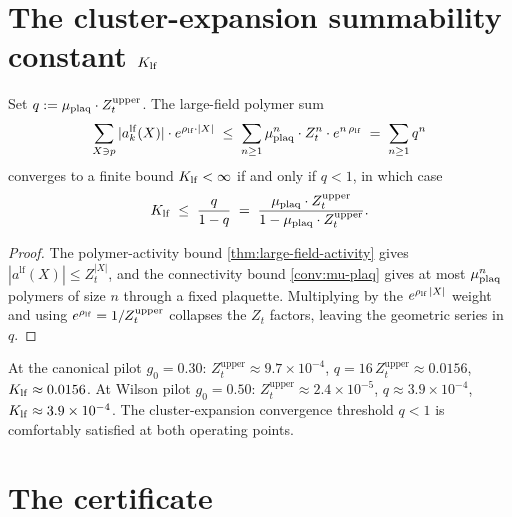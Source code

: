 \section{The cluster-expansion summability constant
  \texorpdfstring{$K_{\mathrm{lf}}$}{K\_lf}}
\label{sec:klf}

%

\begin{theorem}
\label{thm:klf-convergence}
Set $q := \mu_{\mathrm{plaq}} \cdot Z_t^{\mathrm{upper}}$.  The large-field
polymer sum
\begin{equation}
  \label{eq:polymer-sum-lf}
  \sum_{X \ni p} |a_k^{\mathrm{lf}}(X)| \cdot e^{\rho_{\mathrm{lf}} \cdot |X|}
  \;\le\;
  \sum_{n \ge 1} \mu_{\mathrm{plaq}}^n \cdot Z_t^n \cdot e^{n\,\rho_{\mathrm{lf}}}
  \;=\;
  \sum_{n \ge 1} q^n
\end{equation}
converges to a finite bound $K_{\mathrm{lf}} < \infty$ if and only if $q < 1$,
in which case
\begin{equation}
  \label{eq:k-lf-formula}
  K_{\mathrm{lf}} \;\le\; \frac{q}{1 - q} \;=\; \frac{\mu_{\mathrm{plaq}} \cdot Z_t^{\mathrm{upper}}}{1 - \mu_{\mathrm{plaq}} \cdot Z_t^{\mathrm{upper}}} .
\end{equation}
\end{theorem}

\begin{proof}
The polymer-activity bound \cref{thm:large-field-activity} gives
$|a^{\mathrm{lf}}(X)| \le Z_t^{|X|}$, and the connectivity bound
\cref{conv:mu-plaq} gives at most $\mu_{\mathrm{plaq}}^n$ polymers of size $n$
through a fixed plaquette.  Multiplying by the
$e^{\rho_{\mathrm{lf}}\,|X|}$ weight and using $e^{\rho_{\mathrm{lf}}} = 1/Z_t^{\mathrm{upper}}$
collapses the $Z_t$ factors, leaving the geometric series in $q$.
\end{proof}

\begin{infobox}[main][breakable=false,title=Numerical impact]
At the canonical pilot $g_0 = 0.30$:
$Z_t^{\mathrm{upper}} \approx 9.7 \times 10^{-4}$,
$q = 16\,Z_t^{\mathrm{upper}} \approx 0.0156$,
$K_{\mathrm{lf}} \approx 0.0156$.  At Wilson pilot $g_0 = 0.50$:
$Z_t^{\mathrm{upper}} \approx 2.4 \times 10^{-5}$,
$q \approx 3.9 \times 10^{-4}$, $K_{\mathrm{lf}} \approx 3.9 \times 10^{-4}$.
The cluster-expansion convergence threshold $q < 1$ is comfortably
satisfied at both operating points.
\end{infobox}

\section{The certificate}
\label{sec:lf-certificate}

